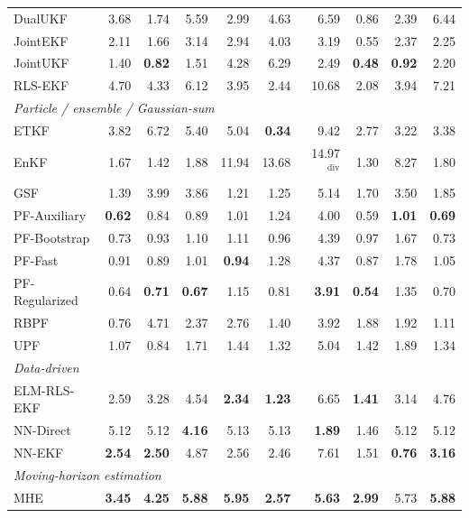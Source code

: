 \begin{longtable}{lrrrrrrrrr}
\quad DualUKF & 3.68 & 1.74 & 5.59 & 2.99 & 4.63 & 6.59 & 0.86 & 2.39 & 6.44 \\
\quad JointEKF & 2.11 & 1.66 & 3.14 & 2.94 & 4.03 & 3.19 & 0.55 & 2.37 & 2.25 \\
\quad JointUKF & 1.40 & \textbf{0.82} & 1.51 & 4.28 & 6.29 & 2.49 & \textbf{0.48} & \textbf{0.92} & 2.20 \\
\quad RLS-EKF & 4.70 & 4.33 & 6.12 & 3.95 & 2.44 & 10.68 & 2.08 & 3.94 & 7.21 \\
\multicolumn{10}{l}{\textit{Particle / ensemble / Gaussian-sum}} \\
\quad ETKF & 3.82 & 6.72 & 5.40 & 5.04 & \textbf{0.34} & 9.42 & 2.77 & 3.22 & 3.38 \\
\quad EnKF & 1.67 & 1.42 & 1.88 & 11.94 & 13.68 & 14.97$^{\mathrm{div}}$ & 1.30 & 8.27 & 1.80 \\
\quad GSF & 1.39 & 3.99 & 3.86 & 1.21 & 1.25 & 5.14 & 1.70 & 3.50 & 1.85 \\
\quad PF-Auxiliary & \textbf{0.62} & 0.84 & 0.89 & 1.01 & 1.24 & 4.00 & 0.59 & \textbf{1.01} & \textbf{0.69} \\
\quad PF-Bootstrap & 0.73 & 0.93 & 1.10 & 1.11 & 0.96 & 4.39 & 0.97 & 1.67 & 0.73 \\
\quad PF-Fast & 0.91 & 0.89 & 1.01 & \textbf{0.94} & 1.28 & 4.37 & 0.87 & 1.78 & 1.05 \\
\quad PF-Regularized & 0.64 & \textbf{0.71} & \textbf{0.67} & 1.15 & 0.81 & \textbf{3.91} & \textbf{0.54} & 1.35 & 0.70 \\
\quad RBPF & 0.76 & 4.71 & 2.37 & 2.76 & 1.40 & 3.92 & 1.88 & 1.92 & 1.11 \\
\quad UPF & 1.07 & 0.84 & 1.71 & 1.44 & 1.32 & 5.04 & 1.42 & 1.89 & 1.34 \\
\multicolumn{10}{l}{\textit{Data-driven}} \\
\quad ELM-RLS-EKF & 2.59 & 3.28 & 4.54 & \textbf{2.34} & \textbf{1.23} & 6.65 & \textbf{1.41} & 3.14 & 4.76 \\
\quad NN-Direct & 5.12 & 5.12 & \textbf{4.16} & 5.13 & 5.13 & \textbf{1.89} & 1.46 & 5.12 & 5.12 \\
\quad NN-EKF & \textbf{2.54} & \textbf{2.50} & 4.87 & 2.56 & 2.46 & 7.61 & 1.51 & \textbf{0.76} & \textbf{3.16} \\
\multicolumn{10}{l}{\textit{Moving-horizon estimation}} \\
\quad MHE & \textbf{3.45} & \textbf{4.25} & \textbf{5.88} & \textbf{5.95} & \textbf{2.57} & \textbf{5.63} & \textbf{2.99} & 5.73 & \textbf{5.88} \\

\end{longtable}
